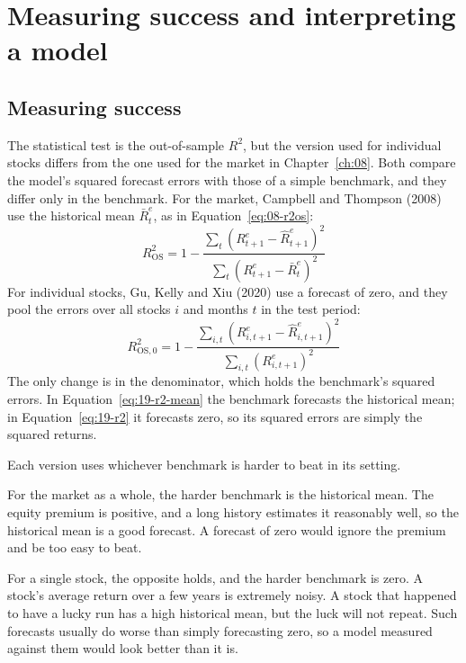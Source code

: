 \section{Measuring success and interpreting a model}
\label{sec:19-measure}

\subsection{Measuring success}

The statistical test is the out-of-sample $R^2$, but the version used for individual stocks differs from the one used for the market in Chapter~\ref{ch:08}. Both compare the model's squared forecast errors with those of a simple benchmark, and they differ only in the benchmark. For the market, Campbell and Thompson (2008) use the historical mean $\bar{R}^{e}_t$, as in Equation~\eqref{eq:08-r2os}:
\begin{equation}
  R^2_{\text{OS}} = 1 - \frac{\sum_{t} \left(R^{e}_{t+1} - \hat{R}^{e}_{t+1}\right)^2}{\sum_{t} \left(R^{e}_{t+1} - \bar{R}^{e}_t\right)^2}
  \label{eq:19-r2-mean}
\end{equation}
For individual stocks, Gu, Kelly and Xiu (2020) use a forecast of zero, and they pool the errors over all stocks $i$ and months $t$ in the test period:
\begin{equation}
  R^2_{\text{OS},0} = 1 - \frac{\sum_{i,t} \left(R^{e}_{i,t+1} - \hat{R}^{e}_{i,t+1}\right)^2}{\sum_{i,t} \left(R^{e}_{i,t+1}\right)^2}
  \label{eq:19-r2}
\end{equation}
The only change is in the denominator, which holds the benchmark's squared errors. In Equation~\eqref{eq:19-r2-mean} the benchmark forecasts the historical mean; in Equation~\eqref{eq:19-r2} it forecasts zero, so its squared errors are simply the squared returns.


Each version uses whichever benchmark is harder to beat in its setting.

For the market as a whole, the harder benchmark is the historical mean. The equity premium is positive, and a long history estimates it reasonably well, so the historical mean is a good forecast. A forecast of zero would ignore the premium and be too easy to beat.

For a single stock, the opposite holds, and the harder benchmark is zero. A stock's average return over a few years is extremely noisy. A stock that happened to have a lucky run has a high historical mean, but the luck will not repeat. Such forecasts usually do worse than simply forecasting zero, so a model measured against them would look better than it is.

